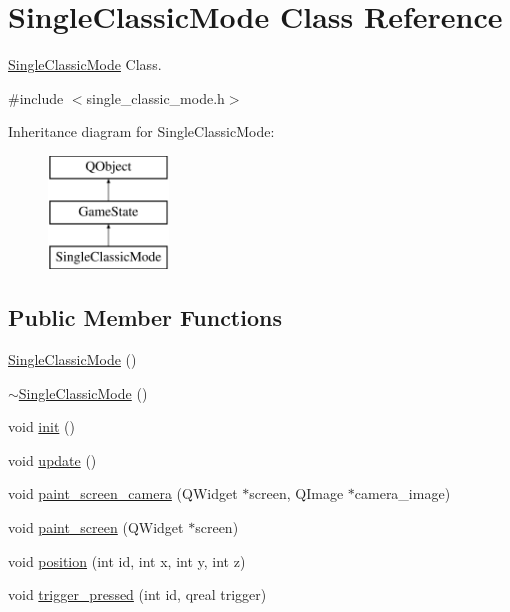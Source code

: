 \hypertarget{class_single_classic_mode}{\section{Single\-Classic\-Mode Class Reference}
\label{class_single_classic_mode}
}


\hyperlink{class_single_classic_mode}{Single\-Classic\-Mode} Class.  




{\ttfamily \#include $<$single\-\_\-classic\-\_\-mode.\-h$>$}

Inheritance diagram for Single\-Classic\-Mode\-:\begin{figure}[H]
\begin{center}
\leavevmode
\includegraphics[height=3.000000cm]{class_single_classic_mode}
\end{center}
\end{figure}
\subsection*{Public Member Functions}
\begin{DoxyCompactItemize}
\item 
\hyperlink{class_single_classic_mode_aed6758fe59d390ec1a369fa9c756ffae}{Single\-Classic\-Mode} ()
\item 
\hyperlink{class_single_classic_mode_abb017549903fd5036a4015b415b2f0e3}{$\sim$\-Single\-Classic\-Mode} ()
\item 
void \hyperlink{class_single_classic_mode_a0ac6b1068b03a5c232175e3e5f411adc}{init} ()
\item 
void \hyperlink{class_single_classic_mode_adf46353472b81fe44128c0621de623df}{update} ()
\item 
void \hyperlink{class_single_classic_mode_a4cef5b1a056fa81a061a03b4041391fc}{paint\-\_\-screen\-\_\-camera} (Q\-Widget $\ast$screen, Q\-Image $\ast$camera\-\_\-image)
\item 
void \hyperlink{class_single_classic_mode_ab5ab513f84edbe6f54406fcd24bcf987}{paint\-\_\-screen} (Q\-Widget $\ast$screen)
\item 
void \hyperlink{class_single_classic_mode_a137bc2caf153ec10402b210ac0b2ca63}{position} (int id, int x, int y, int z)
\item 
void \hyperlink{class_single_classic_mode_a6d56390553ecec6f38548c181dd40848}{trigger\-\_\-pressed} (int id, qreal trigger)
\end{DoxyCompactItemize}
